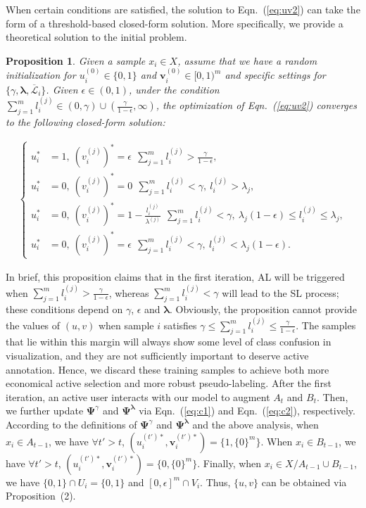 \documentclass[journal]{IEEEtran}
\newtheorem{prop}{Proposition}
\begin{document}
{		When certain conditions are satisfied, the solution to Eqn.~(\ref{eq:uv2}) can take the form of a threshold-based closed-form solution. More specifically, we provide a theoretical solution to the initial problem.
	\begin{prop}
		Given a sample $x_i\in X$, assume that we have a random initialization for $u^{(0)}_i\in\{0,1\}$ and $\mathbf{v}^{(0)}_i\in [0,1)^m$ and specific settings for $\{\gamma,{\bm \lambda},\overline{\mathcal{L}}_i\}$. Given $\epsilon\in(0,1)$, under the condition $\sum_{j=1}^{m}l_i^{(j)}\in(0,\gamma)\cup(\frac{\gamma}{1-\epsilon},\infty)$, the optimization of Eqn.~(\ref{eq:uv2}) converges to the following closed-form solution:
		\begin{small}
			\begin{equation}
			\label{eq:solution}
			\begin{aligned}
			\left\{
			\begin{aligned}
			u_i^\ast & = 1 ,\ (v_i^{(j)})^\ast = \epsilon \ \ \sum_{j=1}^{m}l_i^{(j)} > \frac{\gamma}{1-\epsilon}, \\
			u_i^\ast & = 0 ,\ (v_i^{(j)})^\ast = 0 \ \ \sum_{j=1}^{m}l_i^{(j)} < \gamma ,\ l_i^{(j)}>\lambda_j, \\
			u_i^\ast & = 0 ,\ (v_i^{(j)})^\ast = 1-\frac{l_i^{(j)}}{\lambda^{(j)}} \ \ \sum_{j=1}^{m}l_i^{(j)} < \gamma,\ \lambda_j(1-\epsilon)\leq l_i^{(j)}\leq\lambda_j,\\
			u_i^\ast & = 0 ,\ (v_i^{(j)})^\ast = \epsilon \ \ \sum_{j=1}^{m}l_i^{(j)} < \gamma ,\ l_i^{(j)}<\lambda_j(1-\epsilon).		
			\end{aligned}
			\right.
			\end{aligned}
			\end{equation}
		\end{small}
	\end{prop}In brief, this proposition claims that in the first iteration, AL will be triggered when $\sum_{j=1}^{m}l_i^{(j)} > \frac{\gamma}{1-\epsilon}$, whereas $\sum_{j=1}^{m}l_i^{(j)} < \gamma$ will lead to the SL process; these conditions depend on $\gamma$, $\epsilon$ and ${\bm \lambda}$. Obviously, the proposition cannot provide the values of $(u,v)$ when sample $i$ satisfies $\gamma\leq\sum_{j=1}^{m}l_i^{(j)}\leq\frac{\gamma}{1-\epsilon}$. The samples that lie within this margin will always show some level of class confusion in visualization, and they are not sufficiently important to deserve active annotation. Hence, we discard these training samples to achieve both more economical active selection and more robust pseudo-labeling. After the first iteration, an active user interacts with our model to augment $A_{t}$ and $B_{t}$. Then, we further update $\mathbf{\Psi}^\gamma$ and $\mathbf{\Psi}^{\bm \lambda}$ via Eqn.~(\ref{eq:c1}) and Eqn.~(\ref{eq:c2}), respectively. According to the definitions of $\mathbf{\Psi}^\gamma$ and $ \mathbf{\Psi}^{\bm \lambda}$ and the above analysis, when $x_i\in A_{t-1}$, we have $\forall t'>t$, $(u^{(t')\ast}_i, \mathbf{v}^{(t')\ast}_i)=\{1,\{0\}^m\}$. When $x_i\in B_{t-1}$, we have $\forall t'>t$, $(u^{(t')\ast}_i, \mathbf{v}^{(t')\ast}_i)=\{0,\{0\}^m\}$. Finally, when $x_i\in X/A_{t-1}\cup B_{t-1}$, we have $\{0,1\}\cap U_i = \{0,1\}$ and $[0,\epsilon]^m\cap V_i$. Thus, $\{u,v\}$ can be obtained via Proposition~(2).
	
}
\end{document}
